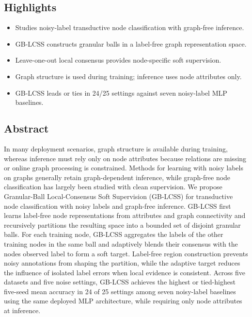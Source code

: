 \subsection{Highlights}\label{highlights}

\begin{itemize}
\tightlist
\item
  Studies noisy-label transductive node classification with graph-free inference.
\item
  GB-LCSS constructs granular balls in a label-free graph representation space.
\item
  Leave-one-out local consensus provides node-specific soft supervision.
\item
  Graph structure is used during training; inference uses node attributes only.
\item
  GB-LCSS leads or ties in 24/25 settings against seven noisy-label MLP baselines.
\end{itemize}

\subsection{Abstract}\label{abstract}

In many deployment scenarios, graph structure is available during training, whereas inference must rely only on node attributes because relations are missing or online graph processing is constrained. Methods for learning with noisy labels on graphs generally retain graph-dependent inference, while graph-free node classification has largely been studied with clean supervision. We propose Granular-Ball Local-Consensus Soft Supervision (GB-LCSS) for transductive node classification with noisy labels and graph-free inference. GB-LCSS first learns label-free node representations from attributes and graph connectivity and recursively partitions the resulting space into a bounded set of disjoint granular balls. For each training node, GB-LCSS aggregates the labels of the other training nodes in the same ball and adaptively blends their consensus with the node\textquotesingle s observed label to form a soft target. Label-free region construction prevents noisy annotations from shaping the partition, while the adaptive target reduces the influence of isolated label errors when local evidence is consistent. Across five datasets and five noise settings, GB-LCSS achieves the highest or tied-highest five-seed mean accuracy in 24 of 25 settings among seven noisy-label baselines using the same deployed MLP architecture, while requiring only node attributes at inference.

